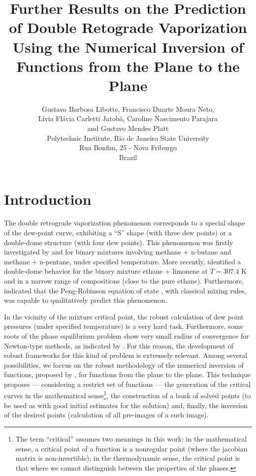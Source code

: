 \documentclass{article}
\title{Further Results on the Prediction of Double Retograde Vaporization Using the Numerical Inversion of Functions from the Plane to the Plane}
\author{Gustavo Barbosa Libotte, Francisco Duarte Moura Neto,\\
L\'{i}via Fl\'{a}via Carletti Jatob\'{a}, Caroline Nascimento Parajara \\ and Gustavo Mendes Platt\\
  \small Polytechnic Institute, Rio de Janeiro State University\\
  \small Rua Bonfim, 25 - Nova Friburgo\\
  \small Brazil
}
\theoremstyle{definition}
\theoremstyle{remark}
\begin{document}
\maketitle


\section{Introduction}

The double retrograde vaporization phenomenon corresponds to a special shape of the dew-point curve, exhibiting a ``S'' shape (with three dew points) or a double-dome structure (with four dew points). This phenomenon was firstly investigated by \cite{chen_1} and \cite{chen_2} for binary mixtures involving methane + n-butane and methane + n-pentane, under specified temperature. More recently, \cite{raeissi_1} identified a double-dome behavior for the binary mixture ethane + limonene at $T = 307.4$ K and in a narrow range of compositions (close to the pure ethane). Furthermore, \cite{raeissi_2} indicated that the Peng-Robinson equation of state \cite{peng_robinson}, with classical mixing rules, was capable to qualitatively predict this phenomenon.

In the vicinity of the mixture critical point, the robust calculation of dew point pressures (under specified temperature) is a very hard task. Furthermore, some roots of the phase equilibrium problem show very small radius of convergence for Newton-type methods, as indicated by \cite{jnsa}. For this reason, the development of robust frameworks for this kind of problem is extremely relevant. Among several possibilities, we foccus on the robust methodology of the numerical inversion of functions, proposed by \cite{malta}, for functions from
the plane to the plane. This technique \cite{malta} proposes --- considering a restrict set of functions --- the generation of the critical curves in the mathematical 
sense\footnote{The term ``critical''  assumes two meanings in this work: in the mathematical sense, a critical point of a function
 is a nonregular point (where the jacobian matrix is non-invertible); in the thermodynamic sense, the critical point is that where we cannot distinguish between the properties of the phases.}, the construction of a bank of solved points (to be used as 
 with good initial estimates for the solution) and, finally, the inversion of the desired points (calculation of all pre-images of a such image).
\end{document}
